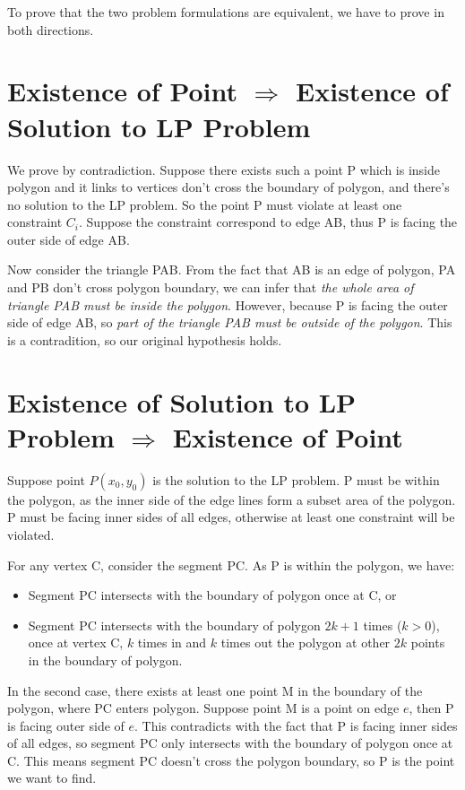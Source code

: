 To prove that the two problem formulations are equivalent, we have to prove in both directions.\\

\section{Existence of Point $\Rightarrow$ Existence of Solution to LP Problem}

We prove by contradiction. Suppose there exists such a point P which is inside polygon and it links to vertices don't cross the boundary of polygon, and there's no solution to the LP problem. So the point P must violate at least one constraint $C_i$. Suppose the constraint correspond to edge AB, thus P is facing the outer side of edge AB.

Now consider the triangle PAB. From the fact that AB is an edge of polygon, PA and PB don't cross polygon boundary, we can infer that \textit{the whole area of triangle PAB must be inside the polygon}. However, because P is facing the outer side of edge AB, so \textit{part of the triangle PAB must be outside of the polygon}. This is a contradition, so our original hypothesis holds.\\

\section{Existence of Solution to LP Problem $\Rightarrow$ Existence of Point}

Suppose point $P(x_0, y_0)$ is the solution to the LP problem. P must be within the polygon, as the inner side of the edge lines form a subset area of the polygon. P must be facing inner sides of all edges, otherwise at least one constraint will be violated.

For any vertex C, consider the segment PC. As P is within the polygon, we have:

\begin{itemize}
  \item Segment PC intersects with the boundary of polygon once at C, or
  \item Segment PC intersects with the boundary of polygon $2k + 1$ times ($k > 0$), once at vertex C, $k$ times in and $k$ times out the polygon at other $2k$ points in the boundary of polygon.
\end{itemize}

In the second case, there exists at least one point M in the boundary of the polygon, where PC enters polygon. Suppose point M is a point on edge $e$, then P is facing outer side of $e$. This contradicts with the fact that P is facing inner sides of all edges, so segment PC only intersects with the boundary of polygon once at C. This means segment PC doesn't cross the polygon boundary, so P is the point we want to find.

